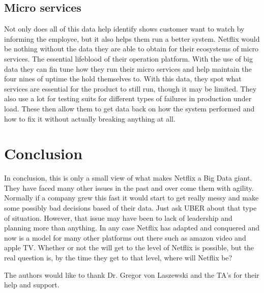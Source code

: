 \documentclass[sigconf]{acmart}
\begin{document}
\subsection{Micro services}
Not only does all of this data help identify shows customer want to watch by informing the employee, but it also helps them run a better system.  Netflix would be nothing without the data they are able to obtain for their ecosystems of micro services.  The essential lifeblood of their operation platform.  With the use of big data they can fin tune how they run their micro services and help maintain the four nines of uptime the hold themselves to.  With this data, they spot what services are essential for the product to still run, though it may be limited.  They also use a lot for testing suits for different types of failures in production under load.  These then allow them to get data back on how the system performed and how to fix it without actually breaking anything at all.
\section{Conclusion}
In conclusion, this is only a small view of what makes Netflix a Big Data giant.  They have faced many other issues in the past and over come them with agility.  Normally if a company grew this fast it would start to get really messy and make some possibly bad decisions based of their data.  Just ask UBER about that type of situation.  However, that issue may have been to lack of leadership and planning more than anything.  In any case Netflix has adapted and conquered and now is a model for many other platforms out there such as amazon video and apple TV.  Whether or not the will get to the level of Netflix is possible, but the real question is, by the time they get to that level, where will Netflix be?\cite{Evans}
\begin{acks}
  The authors would like to thank Dr. Gregor von Laszewski and the TA's for their help and support.
\end{acks}

 
\end{document}
